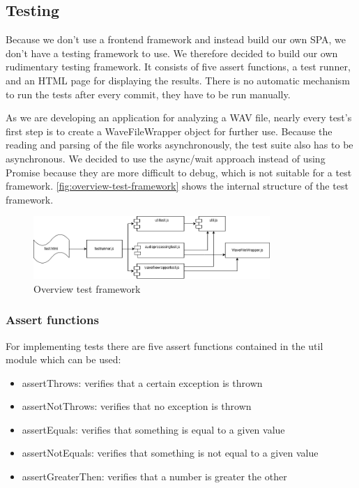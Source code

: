 \subsection{Testing}\label{subsec:testing}
Because we don't use a frontend framework and instead build our own SPA, we don't have a testing framework to use.
We therefore decided to build our own rudimentary testing framework.
It consists of five assert functions, a test runner, and an HTML page for displaying the results.
There is no automatic mechanism to run the tests after every commit, they have to be run manually.

As we are developing an application for analyzing a WAV file, nearly every test's first step is to create a WaveFileWrapper object for further use.
Because the reading and parsing of the file works asynchronously, the test suite also has to be asynchronous.
We decided to use the async/wait approach instead of using Promise because they are more difficult to debug, which is not suitable for a test framework.
\autoref{fig:overview-test-framework} shows the internal structure of the test framework.

\begin{figure}[H]
    \centering
    \includegraphics[width=0.8\textwidth]{../assets/overview_test_framework.png}
    \caption{Overview test framework}\label{fig:overview-test-framework}
\end{figure}

\subsubsection{Assert functions}
For implementing tests there are five assert functions contained in the util module which can be used:

\begin{itemize}
    \item assertThrows: verifies that a certain exception is thrown
    \item assertNotThrows: verifies that no exception is thrown
    \item assertEquals: verifies that something is equal to a given value
    \item assertNotEquals: verifies that something is not equal to a given value
    \item assertGreaterThen: verifies that a number is greater the other
\end{itemize}

